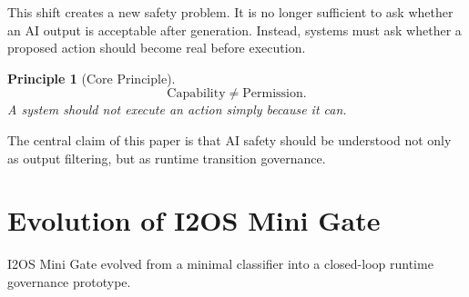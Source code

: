 \documentclass[11pt,a4paper]{article}
\newtheorem{principle}{Principle}
\begin{document}
This shift creates a new safety problem.
It is no longer sufficient to ask whether an AI output is acceptable after generation.
Instead, systems must ask whether a proposed action should become real before execution.

\begin{principle}[Core Principle]
\[
\mathrm{Capability} \neq \mathrm{Permission}.
\]
A system should not execute an action simply because it can.
\end{principle}

The central claim of this paper is that AI safety should be understood not only as output filtering, but as runtime transition governance.

\section{Evolution of I2OS Mini Gate}

I2OS Mini Gate evolved from a minimal classifier into a closed-loop runtime governance prototype.
\end{document}
